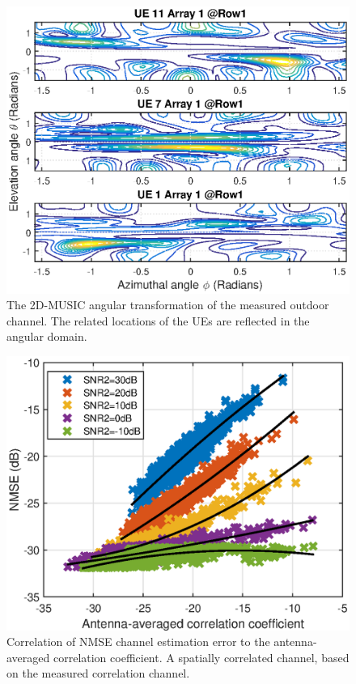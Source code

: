 \begin{figure}[t!]
	\centering
	\includegraphics[width=1\linewidth]{figures/2DMUSICcollocated_row1_array1.eps}
	\caption{The 2D-MUSIC angular transformation of the measured outdoor channel. The related locations of the UEs are reflected in the angular domain.}
	\label{fig:2DMUSIC-measured-collocated-channel}
\end{figure}

\begin{figure}[t!]
	\centering
	\includegraphics[width=1.0\linewidth]{figures/NMSE_correlation_allcases_collocated_wPA.eps}
	\caption{Correlation of NMSE channel estimation error to the antenna-averaged correlation coefficient. A spatially correlated channel, based on
the measured correlation channel.}
	\label{fig:channel_correlation_measured}
\end{figure}
